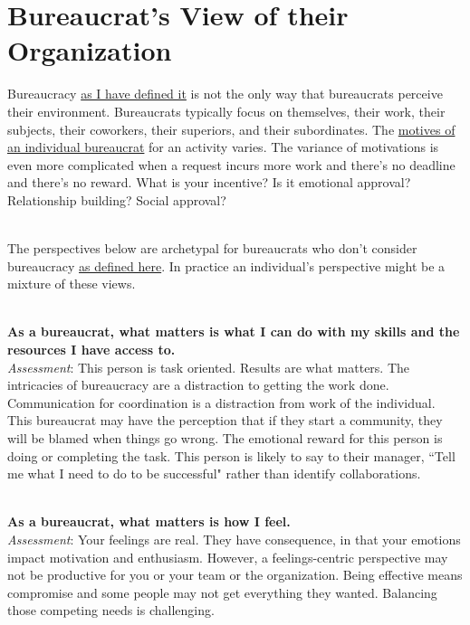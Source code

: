 \section{Bureaucrat's View of their Organization\label{sec:alternative-views-from-within}}

Bureaucracy \hyperref[sec:define-bureaucracy]{as I have defined it} 
is not the only way that bureaucrats perceive their environment. Bureaucrats typically focus on themselves, their work, their subjects, their coworkers, their superiors, and their subordinates. The \hyperref[sec:motivations]{motives of an individual bureaucrat} for an activity varies.
The variance of motivations is even more complicated when a request incurs more work and there's no deadline and there's no reward. What is your incentive? Is it emotional approval? Relationship building? Social approval?

\ \\

The perspectives below are archetypal for bureaucrats who don't consider bureaucracy \hyperref[sec:define-bureaucracy]{as defined here}.
In practice an individual's perspective might be a mixture of these views.

\ \\
\textbf{As a bureaucrat, what matters is what I can do with my skills and the resources I have access to.} \\
\textit{Assessment}: This person is task oriented. Results are what matters. The intricacies of bureaucracy are a distraction to getting the work done. 
Communication  for coordination is a distraction from work of the individual. 
This bureaucrat may have the perception that if they start a community, they will be blamed when things go wrong.
The emotional reward for this person is doing or completing the task. This person is likely to say to their manager, ``Tell me what I need to do to be successful" rather than identify collaborations.

\ \\
\textbf{As a bureaucrat, what matters is how I feel.} \\
\textit{Assessment}: Your feelings are real. They have consequence, in that your emotions impact motivation and enthusiasm. However, a feelings-centric perspective may not be productive for you or your team or the organization. Being effective means compromise and some people may not get everything they wanted. Balancing those competing needs is challenging.

